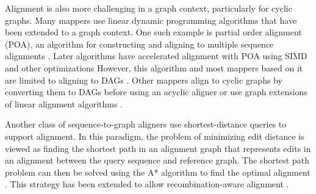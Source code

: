\documentclass[11pt]{ucscthesis}
\begin{document}



Alignment is also more challenging in a graph context, particularly for cyclic graphs.
Many mappers use linear dynamic programming algorithms that have been extended to a graph context.
One such example is partial order alignment (POA), an algorithm for constructing and aligning to multiple sequence alignments \cite{lee_poa_2002}.
Later algorithms have accelerated alignment with POA using SIMD and other optimizations \cite{jain_accelerating_2019,gao_abpoa_2021,darby_vargas_2020}
However, this algorithm and most mappers based on it are limited to aligning to DAGs \cite{kim_hisat2_2019,rakocevic_fast_2019,li_minigraph_2020,ma_graphchainer_2023}.
Other mappers align to cyclic graphs by converting them to DAGs before using an acyclic aligner \cite{garrison_vg_2018} or use graph extensions of linear alignment algorithms \cite{rautiainen_bit-parallel_2019,zhang_fast_2022}. 

Another class of sequence-to-graph aligners use shortest-distance queries to support alignment.
In this paradigm, the problem of minimizing edit distance is viewed as finding the shortest path in an alignment graph that represents edits in an alignment between the query sequence and reference graph.
The shortest path problem can then be solved using the A* algorithm to find the optimal alignment \cite{ivanov_astarix_2020,bonizzoni_recalign_2025}.
This strategy has been extended to allow recombination-aware alignment \cite{bonizzoni_recalign_2025}.
\end{document}
